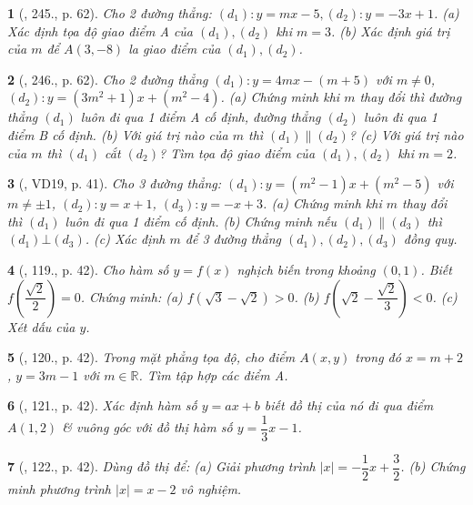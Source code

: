\documentclass{article}
\newtheorem{baitoan}{}
\begin{document}
\begin{baitoan}[\cite{Tuyen_Toan_8}, 245., p. 62]
	Cho 2 đường thẳng: $(d_1):y = mx - 5,(d_2):y = -3x + 1$. (a) Xác định tọa độ giao điểm A của $(d_1),(d_2)$ khi $m = 3$. (b) Xác định giá trị của $m$ để $A(3,-8)$ la giao điểm của $(d_1),(d_2)$.
\end{baitoan}

\begin{baitoan}[\cite{Tuyen_Toan_8}, 246., p. 62]
	Cho 2 đường thẳng $(d_1):y = 4mx - (m + 5)$ với $m\ne0$, $(d_2):y = (3m^2 + 1)x + (m^2 - 4)$. (a) Chứng minh khi $m$ thay đổi thì đường thẳng $(d_1)$ luôn đi qua 1 điểm A cố định, đường thẳng $(d_2)$ luôn đi qua 1 điểm B cố định. (b) Với giá trị nào của $m$ thì $(d_1)\parallel(d_2)$? (c) Với giá trị nào của $m$ thì $(d_1)$ cắt $(d_2)$? Tìm tọa độ giao điểm của $(d_1),(d_2)$ khi $m = 2$.
\end{baitoan}

\begin{baitoan}[\cite{Tuyen_Toan_9_old}, VD19, p. 41]
	Cho 3 đường thẳng: $(d_1):y = (m^2 - 1)x + (m^2 - 5)$ với $m\ne\pm1$, $(d_2):y = x + 1$, $(d_3):y = -x + 3$. (a) Chứng minh khi $m$ thay đổi thì $(d_1)$ luôn đi qua 1 điểm cố định. (b) Chứng minh nếu $(d_1)\parallel(d_3)$ thì $(d_1)\bot(d_3)$. (c) Xác định $m$ để 3 đường thẳng $(d_1),(d_2),(d_3)$ đồng quy.
\end{baitoan}

\begin{baitoan}[\cite{Tuyen_Toan_9_old}, 119., p. 42]
	Cho hàm số $y = f(x)$ nghịch biến trong khoảng $(0,1)$. Biết $f\left(\dfrac{\sqrt{2}}{2}\right) = 0$. Chứng minh: (a) $f(\sqrt{3} - \sqrt{2}) > 0$. (b) $f\left(\sqrt{2} - \dfrac{\sqrt{2}}{3}\right) < 0$. (c) Xét dấu của $y$.
\end{baitoan}

\begin{baitoan}[\cite{Tuyen_Toan_9_old}, 120., p. 42]
	Trong mặt phẳng tọa độ, cho điểm $A(x,y)$ trong đó $x = m + 2$, $y = 3m - 1$ với $m\in\mathbb{R}$. Tìm tập hợp các điểm A.
\end{baitoan}

\begin{baitoan}[\cite{Tuyen_Toan_9_old}, 121., p. 42]
	Xác định hàm số $y = ax + b$ biết đồ thị của nó đi qua điểm $A(1,2)$ \& vuông góc với đồ thị hàm số $y = \dfrac{1}{3}x - 1$.
\end{baitoan}

\begin{baitoan}[\cite{Tuyen_Toan_9_old}, 122., p. 42]
	Dùng đồ thị để: (a) Giải phương trình $|x| = -\dfrac{1}{2}x + \dfrac{3}{2}$. (b) Chứng minh phương trình $|x| = x - 2$ vô nghiệm.
\end{baitoan}
\end{document}
